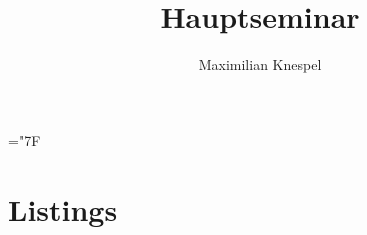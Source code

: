 \documentclass[german,bibnum,beleg,zihtitle,german,hyperref,utf8]{zihpub}
\author{Maximilian Knespel}
\title{Hauptseminar}
\date{}
\begin{document}
\hyphenchar\font=\string"7F %












\appendix




\chapter{Listings}





\end{document}
